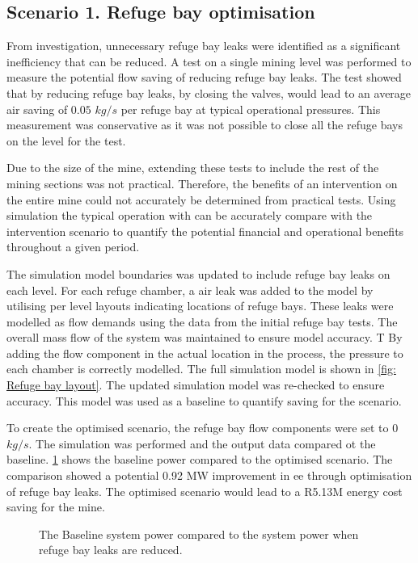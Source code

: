 	\subsection{Scenario 1. Refuge bay optimisation}
	From investigation, unnecessary refuge bay leaks were identified as a significant inefficiency that can be reduced. A test on a single mining level was performed to  measure the potential flow saving of reducing refuge bay leaks. The test showed that by reducing refuge bay leaks, by closing the valves, would lead to an average air saving of $0.05$ $kg/s$ per refuge bay at typical operational pressures. This measurement was conservative as it was not possible to close all the refuge bays on the level for the test. 
	\par 
	Due to the size of the mine, extending these tests to include the rest of the mining sections was not practical. Therefore, the benefits of an intervention on the entire mine could not accurately be determined from practical tests. Using simulation the typical operation with can be accurately compare with the intervention scenario to quantify the potential financial and operational benefits throughout a given period.
	\par
	The simulation model boundaries was updated to include refuge bay leaks on each level. For each refuge chamber, a air leak was added to the model by utilising per level layouts indicating locations of refuge bays. These leaks were modelled as flow demands using the data from the initial refuge bay tests. The overall mass flow of the system was maintained to ensure model accuracy. T  By adding the flow component in the actual location in the process, the pressure to each chamber is correctly modelled. The full simulation model is shown in \cref{fig: Refuge bay layout}. The updated simulation model was re-checked to ensure accuracy. This model was used as a baseline to quantify saving for the scenario.
	\par 
	To create the optimised scenario, the refuge bay flow components were set to 0 $kg/s$. The simulation was performed and the output data compared ot the baseline. \cref{fig: RefugeBay Power.} shows the baseline power compared to the optimised scenario. The comparison showed a potential 0.92 MW  improvement in \gls{ee} through optimisation of refuge bay leaks. The optimised scenario would lead to a R5.13M energy cost saving for the mine.
	\par
	\begin{figure}[h]
		\centering
		
		\caption{The Baseline system power compared to the system power when refuge bay leaks are reduced.}
		\label{fig: RefugeBay Power.}
	\end{figure}   
